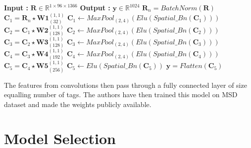 \begin{algorithm}
  \caption{$\textbf{y}$ = $CHOI\_CNN(\textbf{R})$ }      
  \begin{algorithmic}[1]
   \Statex \textbf{Input :} $\textbf{R} \in \mathbb{R}^{1 \times 96 \times 1366}$
   \Statex \textbf{Output :} $\textbf{y} \in \mathbb{R}^{1024}$ 
   \State $\textbf{R}_{n} = BatchNorm(\textbf{R})$
   \State $\textbf{C}_{1} = \textbf{R}_{n}\star\textbf{W1}_{(32)}^{(1,1)}$ 
   \State $\textbf{C}_{1} \leftarrow MaxPool_{(2,4)}(Elu(Spatial\_Bn(\textbf{C}_{1})))$ 
      \State $\textbf{C}_{2} = \textbf{C}_{1}\star\textbf{W2}_{(128)}^{(1,1)}$ 
   \State $\textbf{C}_{2} \leftarrow MaxPool_{(2,4)}(Elu(Spatial\_Bn(\textbf{C}_{2})))$ 
         \State $\textbf{C}_{3} = \textbf{C}_{2}\star\textbf{W3}_{(128)}^{(1,1)}$ 
   \State $\textbf{C}_{3} \leftarrow MaxPool_{(2,4)}(Elu(Spatial\_Bn(\textbf{C}_{3})))$ 
         \State $\textbf{C}_{4} = \textbf{C}_{3}\star\textbf{W4}_{(192)}^{(1,1)}$ 
   \State $\textbf{C}_{4} \leftarrow MaxPool_{(2,4)}(Elu(Spatial\_Bn(\textbf{C}_{4})))$ 
         \State $\textbf{C}_{5} = \textbf{C}_{4}\star\textbf{W5}_{(256)}^{(1,1)}$ 
   \State $\textbf{C}_{5} \leftarrow Elu(Spatial\_Bn(\textbf{C}_{5}))$ 
   \State $\textbf{y} = Flatten(\textbf{C}_{5})$ 
  \end{algorithmic}
\end{algorithm}
\FloatBarrier

\noindent The features from convolutions then pass through a fully connected layer of size equalling  number of tags. The authors have then trained this model on MSD dataset and made the weights publicly available.

\section{Model Selection}

